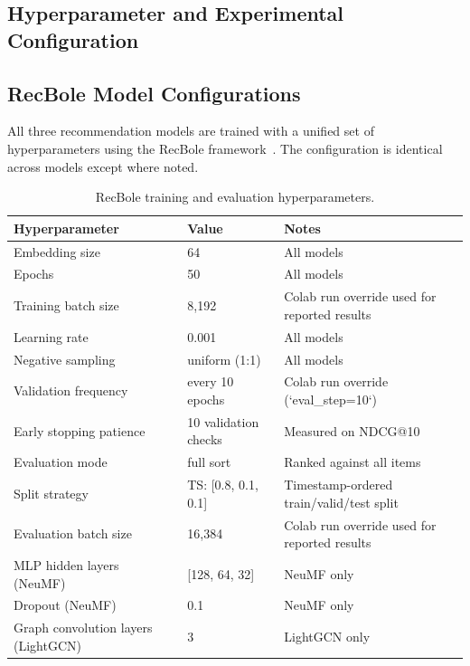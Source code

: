 \documentclass[11pt]{article}
\begin{document}
\newpage
\begin{appendices}

\section{Hyperparameter and Experimental Configuration}\label{appendix:A}

\subsection*{RecBole Model Configurations}

All three recommendation models are trained with a unified set of hyperparameters
using the RecBole framework~\cite{recbole2021}. The configuration is identical across
models except where noted.

\begin{table}[H]
\centering
\small
\begin{tabular}{lll}
\hline
Hyperparameter & Value & Notes \\
\hline
Embedding size          & 64       & All models \\
Epochs                  & 50       & All models \\
Training batch size     & 8{,}192  & Colab run override used for reported results \\
Learning rate           & 0.001    & All models \\
Negative sampling       & uniform (1:1) & All models \\
Validation frequency    & every 10 epochs & Colab run override (`eval\_step=10`) \\
Early stopping patience & 10 validation checks & Measured on NDCG@10 \\
Evaluation mode         & full sort & Ranked against all items \\
Split strategy          & TS: [0.8, 0.1, 0.1] & Timestamp-ordered train/valid/test split \\
Evaluation batch size   & 16{,}384 & Colab run override used for reported results \\
MLP hidden layers (NeuMF) & [128, 64, 32] & NeuMF only \\
Dropout (NeuMF)         & 0.1      & NeuMF only \\
Graph convolution layers (LightGCN) & 3 & LightGCN only \\
\hline
\end{tabular}
\caption{RecBole training and evaluation hyperparameters.}
\label{tab:recbole-config}
\end{table}


\end{appendices}
\end{document}
